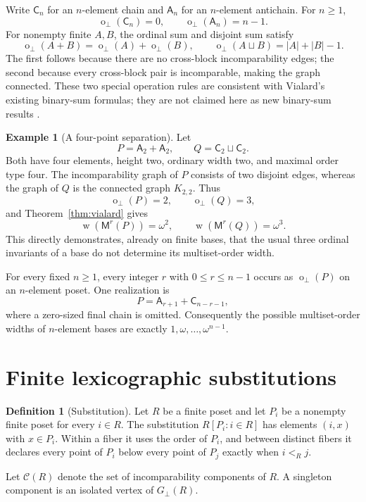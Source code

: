 \documentclass[11pt,a4paper]{article}
\theoremstyle{definition}
\newtheorem{definition}[theorem]{Definition}
\newtheorem{example}[theorem]{Example}
\theoremstyle{remark}
\newcommand{\fot}{\operatorname{o}_{\perp}}
\newcommand{\wid}{\operatorname{w}}
\newcommand{\incg}{G_{\perp}}
\newcommand{\Mr}{\mathsf{M}^{r}}
\newcommand{\CA}{\mathsf{C}}
\newcommand{\Ant}{\mathsf{A}}
\begin{document}
Write $\CA_n$ for an $n$-element chain and $\Ant_n$ for an $n$-element
antichain. For $n\ge1$,
\[
 \fot(\CA_n)=0,\qquad \fot(\Ant_n)=n-1.
\]
For nonempty finite $A,B$, the ordinal sum and disjoint sum satisfy
\[
 \fot(A+B)=\fot(A)+\fot(B),\qquad
 \fot(A\sqcup B)=|A|+|B|-1.
\]
The first follows because there are no cross-block incomparability edges;
the second because every cross-block pair is incomparable, making the
graph connected. These two special operation rules are consistent with
Vialard's existing binary-sum formulas; they are not claimed here as new
binary-sum results \cite[Proposition~4.1]{vialard2023}.

\begin{example}[A four-point separation]\label{ex:four}
Let
\[
 P=\Ant_2+\Ant_2,\qquad Q=\CA_2\sqcup\CA_2.
\]
Both have four elements, height two, ordinary width two, and maximal order
type four. The incomparability graph of $P$ consists of two disjoint edges,
whereas the graph of $Q$ is the connected graph $K_{2,2}$. Thus
\[
 \fot(P)=2,\qquad \fot(Q)=3,
\]
and Theorem~\ref{thm:vialard} gives
\[
 \wid(\Mr(P))=\omega^2,\qquad \wid(\Mr(Q))=\omega^3.
\]
This directly demonstrates, already on finite bases, that the usual three
ordinal invariants of a base do not determine its multiset-order width.
\end{example}

For every fixed $n\ge1$, every integer $r$ with $0\le r\le n-1$ occurs as
$\fot(P)$ on an $n$-element poset. One realization is
\[
 P=\Ant_{r+1}+\CA_{n-r-1},
\]
where a zero-sized final chain is omitted. Consequently the possible
multiset-order widths of $n$-element bases are exactly
$1,\omega,\ldots,\omega^{n-1}$.

\section{Finite lexicographic substitutions}

\begin{definition}[Substitution]
Let $R$ be a finite poset and let $P_i$ be a nonempty finite poset for every
$i\in R$. The substitution $R[P_i:i\in R]$ has elements $(i,x)$ with
$x\in P_i$. Within a fiber it uses the order of $P_i$, and between distinct
fibers it declares every point of $P_i$ below every point of $P_j$ exactly
when $i<_R j$.
\end{definition}

Let $\mathcal C(R)$ denote the set of incomparability components of $R$.
A singleton component is an isolated vertex of $\incg(R)$.
\end{document}
